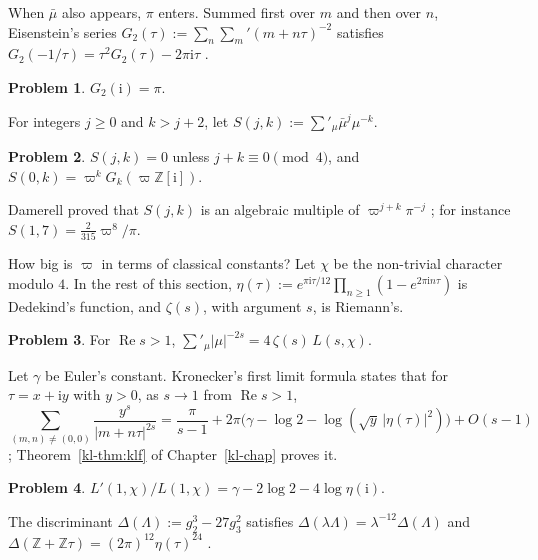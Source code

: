 \documentclass[reqno]{amsart}
\newcounter{chap}
\theoremstyle{definition}
\newtheorem{problem}{Problem}[section]
\theoremstyle{plain}
\newcommand{\Z}{\mathbb{Z}}
\newcommand{\ii}{\mathrm{i}}
\begin{document}
When \(\bar\mu\) also appears, \(\pi\) enters.  Summed first over \(m\) and then over \(n\), Eisenstein's series \(G_2(\tau) := \sum_n \sum_m{}' (m + n\tau)^{-2}\) satisfies \(G_2(-1/\tau) = \tau^2 G_2(\tau) - 2\pi\ii\tau\) \cite{We}.

\begin{problem}\label{pr:G2}
\(G_2(\ii) = \pi\).
\end{problem}

For integers \(j \ge 0\) and \(k > j + 2\), let \(S(j, k) := \sum'_\mu \bar\mu^j \mu^{-k}\).

\begin{problem}\label{pr:S-vanish}
\(S(j, k) = 0\) unless \(j + k \equiv 0 \pmod 4\), and \(S(0, k) = \varpi^k G_k(\varpi\Z[\ii])\).
\end{problem}

Damerell proved that \(S(j, k)\) is an algebraic multiple of \(\varpi^{j+k}\pi^{-j}\) \cite{Dam}; for instance \(S(1, 7) = \tfrac{2}{315}\varpi^8/\pi\).

How big is \(\varpi\) in terms of classical constants?  Let \(\chi\) be the non-trivial character modulo \(4\).  In the rest of this section, \(\eta(\tau) := e^{\pi\ii\tau/12}\prod_{n \ge 1}(1 - e^{2\pi\ii n\tau})\) is Dedekind's function, and \(\zeta(s)\), with argument \(s\), is Riemann's.

\begin{problem}\label{pr:epstein}
For \(\operatorname{Re} s > 1\), \(\sum'_\mu \lvert\mu\rvert^{-2s} = 4\,\zeta(s)\,L(s, \chi)\).
\end{problem}

Let \(\gamma\) be Euler's constant.  Kronecker's first limit formula states that for \(\tau = x + \ii y\) with \(y > 0\), as \(s \to 1\) from \(\operatorname{Re} s > 1\),
\[
  \sum_{(m,n) \ne (0,0)} \frac{y^s}{\lvert m + n\tau\rvert^{2s}} = \frac{\pi}{s-1} + 2\pi\bigl(\gamma - \log 2 - \log(\sqrt{y}\,\lvert\eta(\tau)\rvert^2)\bigr) + O(s-1)
\]
\cite[Ch.~20]{La}; Theorem~\ref{kl-thm:klf} of Chapter~\ref{kl-chap} proves it.

\begin{problem}\label{pr:LL-eta}
\(L'(1, \chi)/L(1, \chi) = \gamma - 2\log 2 - 4\log\eta(\ii)\).
\end{problem}

The discriminant \(\Delta(\Lambda) := g_2^3 - 27g_3^2\) satisfies \(\Delta(\lambda\Lambda) = \lambda^{-12}\Delta(\Lambda)\) and \(\Delta(\Z + \Z\tau) = (2\pi)^{12}\eta(\tau)^{24}\) \cite[\S VII.4.4]{SeA}.
\end{document}

